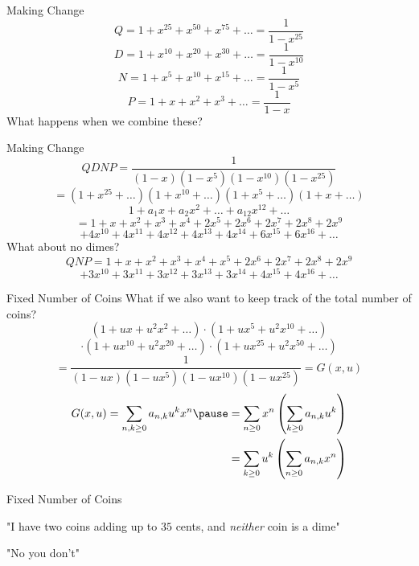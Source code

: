 \documentclass[xcolor=dvipsnames]{beamer}
\begin{document}
\begin{frame}{Making Change}
  \pause
  $$ Q = 1 + x^{25} + x^{50} + x^{75} + \ldots  = \frac{1}{1-x^{25}}$$
  \pause
  $$ D = 1 + x^{10} +x^{20} + x^{30} + \ldots = \frac{1}{1 - x^{10}}$$
  \pause
  $$ N = 1 + x^{5} +x^{10} + x^{15} + \ldots = \frac{1}{1 - x^{5}}$$
  \pause
  $$ P = 1 + x +x^{2} + x^{3} + \ldots = \frac{1}{1 - x}$$
  \pause
  What happens when we combine these?
\end{frame}


\begin{frame}{Making Change}
  $$QDNP = \frac{1}{(1-x)(1-x^5)(1-x^{10})(1-x^{25})}$$
  $$= (1 + x^{25}+\ldots)(1+x^{10}+\ldots)(1 + x^5 +\ldots)(1+x+\ldots)$$
  \pause
  $$ 1 + a_1x + a_2 x^2 + \ldots + a_{12}x^{12} + \ldots $$ \pause
  $$ = 1 + x + x^2 + x^3 + x^4 + 2x^5 + 2x^6 + 2x^7 + 2x^8 + 2x^9 $$
  $$ + 4x^{10} + 4x^{11} + 4x^{12} + 4x^{13} +4x^{14} + 
    6x^{15} + 6x^{16} + \ldots $$
  \pause
  What about no dimes? 
  $$QNP = 1 + x + x^2 + x^3 + x^4 + x^5 + 2x^6 + 2x^7 + 2x^8 + 2x^9$$
  $$+ 3x^{10} + 3x^{11} + 3x^{12} + 3x^{13} + 3x^{14} + 4x^{15} + 4x^{16} +
  \ldots $$ 
\end{frame}


\begin{frame}{Fixed Number of Coins}
  What if we also want to keep track of the total number of coins?
  \pause
  $$
  (1 + ux + u^2x^2 + \ldots ) \cdot
  (1 + ux^5 + u^2x^{10} + \ldots )$$
  $$ \cdot (1 + ux^{10} + u^2x^{20} + \ldots )\cdot
  (1 + ux^{25} + u^2x^{50} + \ldots )
  $$
  \pause
  $$ = \frac{1}{(1-ux)(1-ux^5)(1-ux^{10})(1-ux^{25})} = G(x,u)$$
  \pause
  $$ \begin{aligned}
  G(x,u) = \sum_{n,k \geq 0} a_{n,k}u^kx^n \pause &=
    \sum_{n\geq 0}x^n \left( \sum_{k \geq 0} a_{n,k} u^k\right) \\
    &= \sum_{k\geq 0}u^k \left( \sum_{n \geq 0} a_{n,k} x^n\right) 
    \end{aligned}
    $$
\end{frame}


\begin{frame}{Fixed Number of Coins}
  \begin{center}
  "I have two coins adding up to $35$ cents, and \emph{neither} coin is a dime"
  \pause
  \vspace{2pc}
  
  "No you don't"
  \end{center}
\end{frame}
\end{document}
